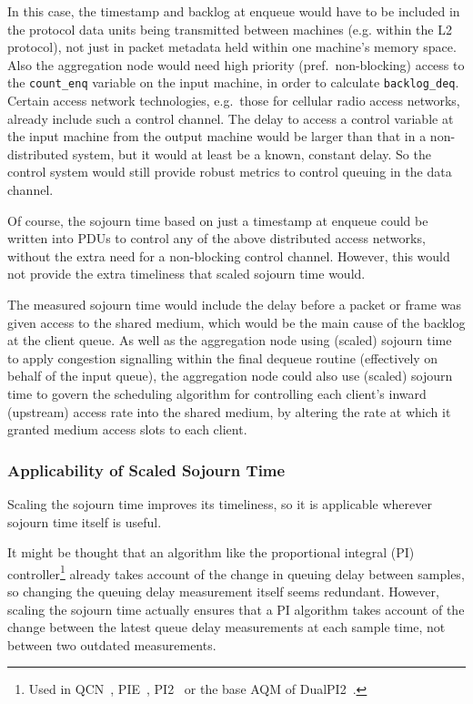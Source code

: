 In this case, the timestamp and backlog at enqueue would have to be included in the protocol data units being transmitted between machines (e.g. within the L2 protocol), not just in packet metadata held within one machine's memory space. Also the aggregation node would need high priority (pref.\ non-blocking) access to the \texttt{count\_enq} variable on the input machine, in order to calculate \texttt{backlog\_deq}. Certain access network technologies, e.g.\ those for cellular radio access networks, already include such a control channel. The delay to access a control variable at the input machine from the output machine would be larger than that in a non-distributed system, but it would at least be a known, constant delay. So the control system would still provide robust metrics to control queuing in the data channel.

Of course, the sojourn time based on just a timestamp at enqueue could be written into PDUs to control any of the above distributed access networks, without the extra need for a non-blocking control channel. However, this would not provide the extra timeliness that scaled sojourn time would.

The measured sojourn time would include the delay before a packet or frame was given access to the shared medium, which would be the main cause of the backlog at the client queue. As well as the aggregation node using (scaled) sojourn time to apply congestion signalling within the final dequeue routine (effectively on behalf of the input queue), the aggregation node could also use (scaled) sojourn time to govern the scheduling algorithm for controlling each client's inward (upstream) access rate into the shared medium, by altering the rate at which it granted medium access slots to each client.

\subsubsection{Applicability of Scaled Sojourn Time}\label{sec:inst_svc_time_applic}

Scaling the sojourn time improves its timeliness, so it is applicable wherever sojourn time itself is useful.

It might be thought that an algorithm like the proportional integral (PI) controller\footnote{Used in QCN~\cite{IEEE802.1Qau:Ethernet_QCN}, PIE~\cite{Pan17:PIE}, PI2~\cite{DeSchepper16a:PI2} or the base AQM of DualPI2~\cite{Briscoe15e:DualQ-Coupled-AQM_ID}.} already takes account of the change in queuing delay between samples, so changing the queuing delay measurement itself seems redundant. However, scaling the sojourn time actually ensures that a PI algorithm takes account of the change between the latest queue delay measurements at each sample time, not between two outdated measurements.

